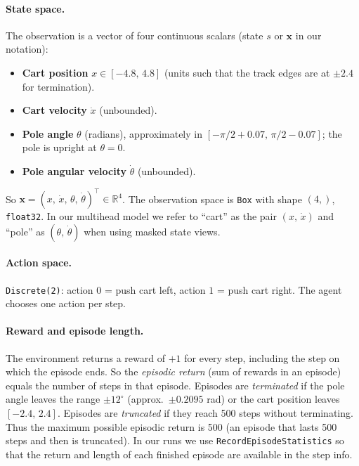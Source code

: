 \documentclass[11pt]{article}
\begin{document}
\paragraph{State space.} The observation is a vector of four continuous scalars (state $s$ or $\mathbf{x}$ in our notation):
\begin{itemize}
\item \textbf{Cart position} $x \in [-4.8,\, 4.8]$ (units such that the track edges are at $\pm 2.4$ for termination).
\item \textbf{Cart velocity} $\dot{x}$ (unbounded).
\item \textbf{Pole angle} $\theta$ (radians), approximately in $[-\pi/2+0.07,\, \pi/2-0.07]$; the pole is upright at $\theta = 0$.
\item \textbf{Pole angular velocity} $\dot{\theta}$ (unbounded).
\end{itemize}
So $\mathbf{x} = (x,\, \dot{x},\, \theta,\, \dot{\theta})^\top \in \mathbb{R}^4$. The observation space is \texttt{Box} with shape $(4,)$, \texttt{float32}. In our multihead model we refer to ``cart'' as the pair $(x,\, \dot{x})$ and ``pole'' as $(\theta,\, \dot{\theta})$ when using masked state views.

\paragraph{Action space.} \texttt{Discrete(2)}: action $0$ = push cart left, action $1$ = push cart right. The agent chooses one action per step.

\paragraph{Reward and episode length.} The environment returns a reward of $+1$ for every step, including the step on which the episode ends. So the \emph{episodic return} (sum of rewards in an episode) equals the number of steps in that episode. Episodes are \emph{terminated} if the pole angle leaves the range $\pm 12^\circ$ (approx.\ $\pm 0.2095$ rad) or the cart position leaves $[-2.4,\, 2.4]$. Episodes are \emph{truncated} if they reach 500 steps without terminating. Thus the maximum possible episodic return is 500 (an episode that lasts 500 steps and then is truncated). In our runs we use \texttt{RecordEpisodeStatistics} so that the return and length of each finished episode are available in the step info.
\end{document}
